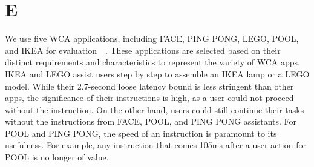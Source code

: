 \section{E}

We use five WCA applications, including FACE, PING PONG, LEGO, POOL, and IKEA
for evaluation~\cite{chen2017empirical}~\cite{chen2018application}. These
applications are selected based on their distinct requirements and
characteristics to represent the variety of WCA apps. IKEA and LEGO assist users
step by step to assemble an IKEA lamp or a LEGO model. While their 2.7-second
loose latency bound is less stringent than other apps, the significance of their
instructions is high, as a user could not proceed without the instruction. On
the other hand, users could still continue their tasks without the instructions
from FACE, POOL, and PING PONG assistants. For POOL and PING PONG, the speed of
an instruction is paramount to its usefulness. For example, any instruction that
comes 105ms after a user action for POOL is no longer of value.

